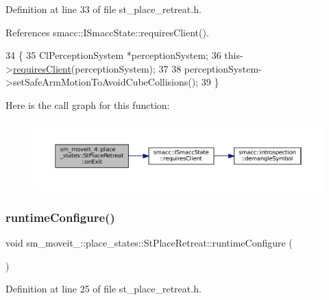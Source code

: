 Definition at line 33 of file st\+\_\+place\+\_\+retreat.\+h.



References smacc\+::\+I\+Smacc\+State\+::requires\+Client().


\begin{DoxyCode}
34     \{
35         ClPerceptionSystem *perceptionSystem;
36         this->\hyperlink{classsmacc_1_1ISmaccState_a7f95c9f0a6ea2d6f18d1aec0519de4ac}{requiresClient}(perceptionSystem);
37 
38         perceptionSystem->setSafeArmMotionToAvoidCubeCollisions();
39     \}
\end{DoxyCode}
Here is the call graph for this function\+:
\nopagebreak
\begin{figure}[H]
\begin{center}
\leavevmode
\includegraphics[width=350pt]{structsm__moveit__4_1_1place__states_1_1StPlaceRetreat_a700f6a70e4c9836fef4b4b3e9546500d_cgraph}
\end{center}
\end{figure}
\mbox{\label{structsm__moveit__4_1_1place__states_1_1StPlaceRetreat_a592a95bb086fd10381dee175af55e71e}} 
\subsubsection{\texorpdfstring{runtime\+Configure()}{runtimeConfigure()}}
{\footnotesize\ttfamily void sm\+\_\+moveit\+\_\+::place\+\_\+states\+::\+St\+Place\+Retreat\+::runtime\+Configure (\begin{DoxyParamCaption}{ }\end{DoxyParamCaption})\hspace{0.3cm}{\ttfamily [inline]}}



Definition at line 25 of file st\+\_\+place\+\_\+retreat.\+h.



